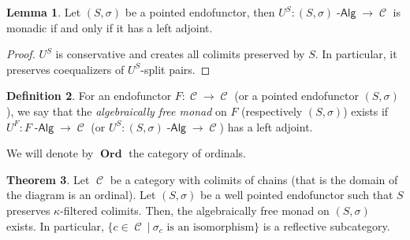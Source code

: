 \documentclass[a4paper,11pt,oneside,openany]{scrbook}
\DeclareMathOperator{\Alg}{-\mathsf{Alg}}
\DeclareMathOperator{\C}{\mathcal{C}}
\DeclareMathOperator{\Ord}{\mathbf{Ord}}
\theoremstyle{definition}
\newtheorem{thm}{Theorem}[section] %
\theoremstyle{definition}
\newtheorem{defn}[thm]{Definition} %
\newtheorem{lemma}[thm]{Lemma}
\begin{document}
\begin{lemma}
	Let $(S,\sigma)$ be a pointed endofunctor, then $U^S\colon(S,\sigma)\Alg\to\C$ is monadic if and only if it has a left adjoint.
\end{lemma}
\begin{proof}
	$U^S$ is conservative and creates all colimits preserved by $S$. In particular, it preserves coequalizers of $U^S$-split pairs.
\end{proof}
\begin{defn}
	For an endofunctor $F\colon\C\to\C$ (or a pointed endofunctor $(S,\sigma)$), we say that the \emph{algebraically free monad} on $F$ (respectively  $(S,\sigma)$) exists if $U^F\colon F\Alg\to\C$ (or $U^S\colon(S,\sigma)\Alg\to\C$) has a left adjoint.
\end{defn}

We will denote by $\Ord$ the category of ordinals.

\begin{thm}
    Let $\C$ be a category with colimits of chains (that is the domain of the diagram is an ordinal). Let $(S,\sigma)$ be a well pointed endofunctor such that $S$ preserves $\kappa$-filtered colimits. Then, the algebraically free monad on $(S,\sigma)$ exists. In particular, $\{c\in\C\ |\ \sigma_c\text{ is an isomorphism}\}$ is a reflective subcategory.
\end{thm}
\end{document}
